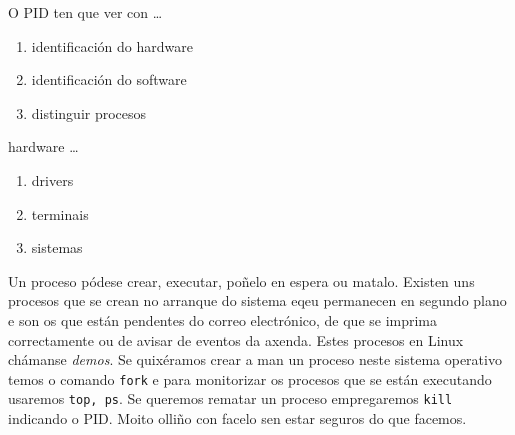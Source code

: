 \begin{diapo} \begin{frame}{ O PID ten que ver con   \dots} 
\begin{enumerate}
	\item identificación do hardware\pause
	\item  identificación do software \pause
	\item distinguir procesos 
\end{enumerate} \end{frame}  \end{diapo}  
\begin{diapo}\begin{frame}{ hardware   \dots}
\begin{enumerate}
	\item drivers \pause
	\item terminais \pause
	\item sistemas 
\end{enumerate} \end{frame} \end{diapo}
Un proceso pódese crear, executar, poñelo en espera ou matalo. Existen uns procesos que se crean no arranque do sistema eqeu permanecen en segundo plano e son os que están pendentes do correo electrónico, de que se imprima correctamente ou de avisar de eventos da axenda. Estes procesos en Linux chámanse \textit{demos}. Se quixéramos crear a man un proceso neste sistema operativo temos o comando \texttt{fork} e para monitorizar os procesos que se están executando usaremos \texttt{top, ps}. Se queremos rematar un proceso empregaremos \texttt{kill} indicando o PID. Moito olliño con facelo sen estar seguros do que facemos.\\


